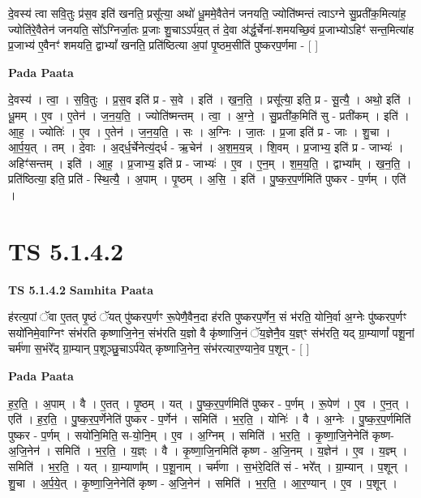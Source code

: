 \documentclass[17pt]{extarticle}
\begin{document}
दे॒वस्य॑ त्वा सवि॒तुः प्र॑स॒व इति॑ खनति॒ प्रसू᳚त्या॒ अथो॑ धू॒ममे॒वैतेन॑ जनयति॒ ज्योति॑ष्मन्तं त्वाऽग्ने सु॒प्रती॑क॒मित्या॑ह॒ ज्योति॑रे॒वैतेन॑ जनयति॒ सो᳚ऽग्निर्जा॒तः प्र॒जाः शु॒चाऽऽर्प॑य॒त् तं दे॒वा अ॑र्द्ध॒र्चेना॑-शमयच्छि॒वं प्र॒जाभ्योऽहिꣳ॑ सन्त॒मित्या॑ह प्र॒जाभ्य॑ ए॒वैनꣳ॑ शमयति॒ द्वाभ्यां᳚ खनति॒ प्रति॑ष्ठित्या अ॒पां पृ॒ष्ठम॒सीति॑ पुष्करप॒र्णमा - [  ] \newline

\textbf{Pada Paata} \newline

दे॒वस्य॑ । त्वा॒ । स॒वि॒तुः । प्र॒स॒व इति॑ प्र - स॒वे । इति॑ । ख॒न॒ति॒ । प्रसू᳚त्या॒ इति॒ प्र - सू॒त्यै॒ । अथो॒ इति॑ । धू॒मम् । ए॒व । ए॒तेन॑ । ज॒न॒य॒ति॒ । ज्योति॑ष्मन्तम् । त्वा॒ । अ॒ग्ने॒ । सु॒प्रती॑क॒मिति॑ सु - प्रती॑कम् । इति॑ । आ॒ह॒ । ज्योतिः॑ । ए॒व । ए॒तेन॑ । ज॒न॒य॒ति॒ । सः । अ॒ग्निः । जा॒तः । प्र॒जा इति॑ प्र - जाः । शु॒चा । आ॒र्प॒य॒त् । तम् । दे॒वाः । अ॒द्‌र्ध॒र्चेनेत्य॒॑द्‌र्ध - ऋ॒चेन॑ । अ॒श॒म॒य॒न्न् । शि॒वम् । प्र॒जाभ्य॒ इति॑ प्र - जाभ्यः॑ । अहिꣳ॑सन्तम् । इति॑ । आ॒ह॒ । प्र॒जाभ्य॒ इति॑ प्र - जाभ्यः॑ । ए॒व । ए॒न॒म् । श॒म॒य॒ति॒ । द्वाभ्या᳚म् । ख॒न॒ति॒ । प्रति॑ष्ठित्या॒ इति॒ प्रति॑ - स्थि॒त्यै॒ । अ॒पाम् । पृ॒ष्ठम् । अ॒सि॒ । इति॑ । पु॒ष्क॒र॒प॒र्णमिति॑ पुष्कर - प॒र्णम् । एति॑ ।  \newline





\section{ TS 5.1.4.2 }

\textbf{TS 5.1.4.2 } \newline
\textbf{Samhita Paata} \newline

ह॑रत्य॒पां ॅवा ए॒तत् पृ॒ष्ठं ॅयत् पु॑ष्करप॒र्णꣳ रू॒पेणै॒वैन॒दा ह॑रति पुष्करप॒र्णेन॒ सं भ॑रति॒ योनि॒र्वा अ॒ग्नेः पु॑ष्करप॒र्णꣳ सयो॑निमे॒वाग्निꣳ संभ॑रति कृष्णाजि॒नेन॒ संभ॑रति य॒ज्ञो वै कृ॑ष्णाजि॒नं ॅय॒ज्ञेनै॒व य॒ज्ञ्ꣳ संभ॑रति॒ यद् ग्रा॒म्याणां᳚ पशू॒नां चर्म॑णा स॒भंरे᳚द् ग्रा॒म्यान् प॒शूञ्छु॒चाऽर्प॑येत् कृष्णाजि॒नेन॒ संभ॑रत्यार॒ण्याने॒व प॒शून् - [  ] \newline

\textbf{Pada Paata} \newline

ह॒र॒ति॒ । अ॒पाम् । वै । ए॒तत् । पृ॒ष्ठम् । यत् । पु॒ष्क॒र॒प॒र्णमिति॑ पुष्कर - प॒र्णम् । रू॒पेण॑ । ए॒व । ए॒न॒त् । एति॑ । ह॒र॒ति॒ । पु॒ष्क॒र॒प॒र्णेनेति॑ पुष्कर - प॒र्णेन॑ । समिति॑ । भ॒र॒ति॒ । योनिः॑ । वै । अ॒ग्नेः । पु॒ष्क॒र॒प॒र्णमिति॑ पुष्कर - प॒र्णम् । सयो॑नि॒मिति॒ स-यो॒नि॒म् । ए॒व । अ॒ग्निम् । समिति॑ । भ॒र॒ति॒ । कृ॒ष्णा॒जि॒नेनेति॑ कृष्ण-अ॒जि॒नेन॑ । समिति॑ । भ॒र॒ति॒ । य॒ज्ञ्ः । वै । कृ॒ष्णा॒जि॒नमिति॑ कृष्ण - अ॒जि॒नम् । य॒ज्ञेन॑ । ए॒व । य॒ज्ञ्म् । समिति॑ । भ॒र॒ति॒ । यत् । ग्रा॒म्याणा᳚म् । प॒शू॒नाम् । चर्म॑णा । स॒भंरे॒दिति॑ सं - भरे᳚त् । ग्रा॒म्यान् । प॒शून् । शु॒चा । अ॒र्प॒ये॒त् । कृ॒ष्णा॒जि॒नेनेति॑ कृष्ण - अ॒जि॒नेन॑ । समिति॑ । भ॒र॒ति॒ । आ॒र॒ण्यान् । ए॒व । प॒शून् ।  \newline
\end{document}
